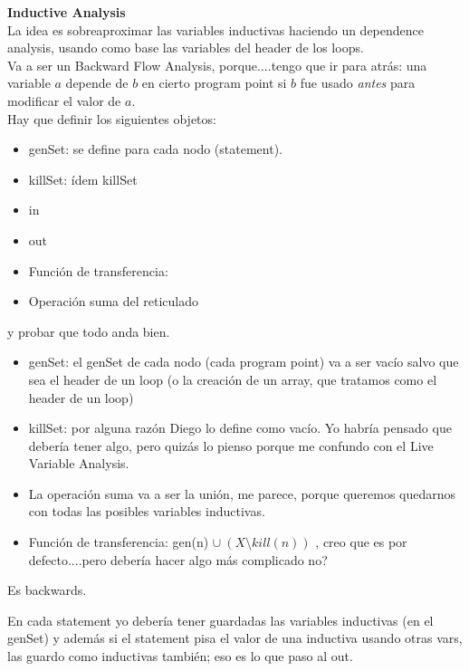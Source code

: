 \documentclass[10pt,a4paper,twoside]{report}
\begin{document}
\textbf{Inductive Analysis}\\

La idea es sobreaproximar las variables inductivas haciendo un dependence analysis, usando como base las variables del header de los loops. \\

Va a ser un Backward Flow Analysis, porque....tengo que ir para atrás: una variable $a$ depende de $b$ en cierto program point si $b$ fue usado \textit{antes} para modificar el valor de $a$. \\

Hay que definir los siguientes objetos:

\begin{itemize}
	\item genSet: se define para cada nodo (statement).
	\item killSet: ídem killSet
	\item in
	\item out
	\item Función de transferencia:
	\item Operación suma del reticulado
\end{itemize}

y probar que todo anda bien.


\begin{itemize}
	\item genSet: el genSet de cada nodo (cada program point) va a ser vacío salvo que sea el header de un loop (o la creación de un array, que tratamos como el header de un loop)
	\item killSet: por alguna razón Diego lo define como vacío. Yo habría pensado que debería tener algo, pero quizás lo pienso porque me confundo con el Live Variable Analysis.
	\item La operación suma va a ser la unión, me parece, porque queremos quedarnos con todas las posibles variables inductivas.
	\item Función de transferencia: gen(n) $\cup\ (X \setminus kill(n))$ , creo que es por defecto....pero debería hacer algo más complicado no?
\end{itemize}

Es backwards.

En cada statement yo debería tener guardadas las variables inductivas (en el genSet) y además si el statement pisa el valor de una inductiva usando otras vars, las guardo como inductivas también; eso es lo que paso al out.
\end{document}
